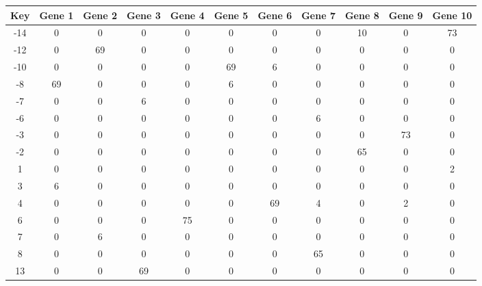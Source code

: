 \begin{tabular}{|c|c|c|c|c|c|c|c|c|c|c|}
\hline
Key & Gene 1 & Gene 2 & Gene 3 & Gene 4 & Gene 5 & Gene 6 & Gene 7 & Gene 8 & Gene 9 & Gene 10 \\
\hline
-14 & 0 & 0 & 0 & 0 & 0 & 0 & 0 & 10 & 0 & 73 \\
-12 & 0 & 69 & 0 & 0 & 0 & 0 & 0 & 0 & 0 & 0 \\
-10 & 0 & 0 & 0 & 0 & 69 & 6 & 0 & 0 & 0 & 0 \\
-8 & 69 & 0 & 0 & 0 & 6 & 0 & 0 & 0 & 0 & 0 \\
-7 & 0 & 0 & 6 & 0 & 0 & 0 & 0 & 0 & 0 & 0 \\
-6 & 0 & 0 & 0 & 0 & 0 & 0 & 6 & 0 & 0 & 0 \\
-3 & 0 & 0 & 0 & 0 & 0 & 0 & 0 & 0 & 73 & 0 \\
-2 & 0 & 0 & 0 & 0 & 0 & 0 & 0 & 65 & 0 & 0 \\
1 & 0 & 0 & 0 & 0 & 0 & 0 & 0 & 0 & 0 & 2 \\
3 & 6 & 0 & 0 & 0 & 0 & 0 & 0 & 0 & 0 & 0 \\
4 & 0 & 0 & 0 & 0 & 0 & 69 & 4 & 0 & 2 & 0 \\
6 & 0 & 0 & 0 & 75 & 0 & 0 & 0 & 0 & 0 & 0 \\
7 & 0 & 6 & 0 & 0 & 0 & 0 & 0 & 0 & 0 & 0 \\
8 & 0 & 0 & 0 & 0 & 0 & 0 & 65 & 0 & 0 & 0 \\
13 & 0 & 0 & 69 & 0 & 0 & 0 & 0 & 0 & 0 & 0 \\
\hline
\end{tabular}